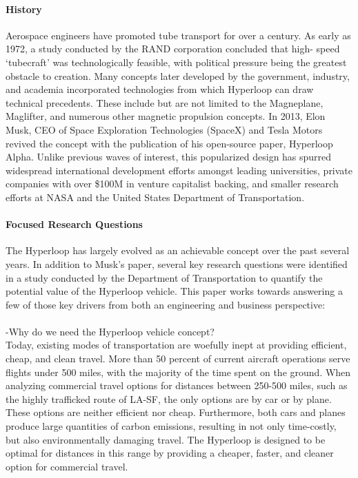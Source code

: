 \paragraph{History}

	Aerospace engineers have promoted tube transport for over a century.
	As early as 1972, a study conducted by the RAND corporation concluded that high-
	speed `tubecraft' was technologically feasible, with political pressure being the greatest
	obstacle to creation.\cite{RAND} Many concepts later developed by
	the government, industry, and academia incorporated technologies from which
	Hyperloop can draw technical precedents.
	These include but are not limited to the Magneplane, Maglifter, and numerous
	other magnetic propulsion concepts. In 2013, Elon Musk, CEO of Space Exploration
	Technologies (SpaceX) and Tesla Motors revived the concept with the publication
	of his open-source paper, Hyperloop Alpha.\cite{Musk}
	Unlike previous waves of interest, this popularized design has spurred widespread international
	development efforts amongst leading universities, private companies with over
	\$100M in venture capitalist backing, and smaller research efforts at NASA and the
	United States Department of Transportation. \cite{Chin}

\paragraph{Focused Research Questions}

	The Hyperloop has largely evolved as an achievable concept over the past several years.
	In addition to Musk's paper, several key research questions were identified in a study conducted
	by the Department of Transportation to quantify the potential value of the
	Hyperloop vehicle. \cite{Volpe} This paper works towards answering a few of
	those key drivers from both an engineering and business perspective:\\

	\\
	-Why do we need the Hyperloop vehicle concept?\\

	Today, existing modes of transportation are woefully inept at providing efficient, cheap, and
	clean travel. More than 50 percent of current aircraft operations serve flights under 500
	miles, with the majority of the time spent on the ground. When analyzing commercial
	travel options for distances between 250-500 miles, such as the highly trafficked route of LA-SF,
	the only options are by car or by plane. These options are neither efficient nor cheap. Furthermore,
	both cars and planes produce large quantities of carbon emissions, resulting in not only
	time-costly, but also environmentally damaging travel. The Hyperloop is designed to be
	optimal for distances in this range by providing a cheaper, faster, and cleaner
	option for commercial travel.\\

